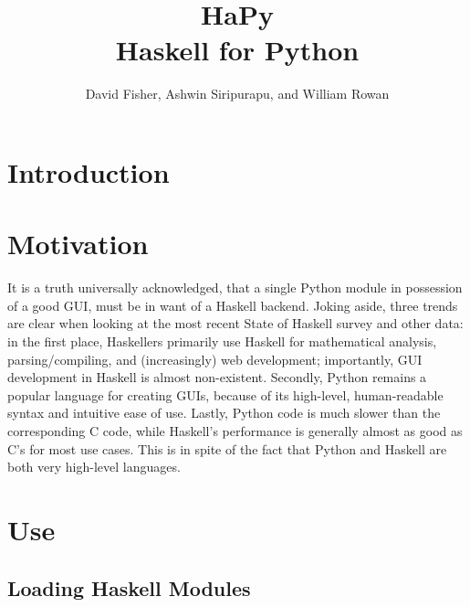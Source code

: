 \documentclass[11pt, letterpaper, oneside, twocolumn] {article}
\begin{document}
\title{HaPy \\
Haskell for Python
}
\author{David Fisher, Ashwin Siripurapu, and William Rowan}
\maketitle

\section{Introduction}

\section{Motivation}
It is a truth universally acknowledged, that a single Python module in possession of a good GUI, must be in want of a Haskell backend. Joking aside, three trends are clear when looking at the most recent State of Haskell survey and other data: in the first place, Haskellers primarily use Haskell for mathematical analysis, parsing/compiling, and (increasingly) web development; importantly, GUI development in Haskell is almost non-existent. Secondly, Python remains a popular language for creating GUIs, because of its high-level, human-readable syntax and intuitive ease of use. Lastly, Python code is much slower than the corresponding C code, while Haskell's performance is generally almost as good as C's for most use cases. This is in spite of the fact that Python and Haskell are both very high-level languages. 

\section{Use}

\subsection{Loading Haskell Modules}
\end{document}

